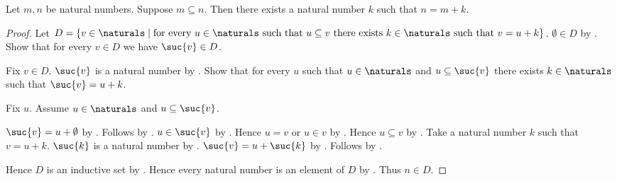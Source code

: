 \begin{theorem}\label{natural_additive_difference}
    Let $m,n$ be natural numbers.
    Suppose $m\subseteq n$.
    Then there exists a natural number $k$ such that $n=m+k$.
\end{theorem}
\begin{proof}
    Let $D=\{v\in\naturals\mid
        \text{for every $u\in\naturals$ such that $u\subseteq v$
        there exists $k\in\naturals$ such that $v=u+k$}\}$.
    $\emptyset\in D$
        by .
    Show that for every $v\in D$ we have $\suc{v}\in D$.
    \begin{subproof}
        Fix $v\in D$.
        $\suc{v}$ is a natural number by .
        Show that for every $u$ such that
            $u\in\naturals$ and $u\subseteq\suc{v}$
            there exists $k\in\naturals$ such that
            $\suc{v}=u+k$.
        \begin{subproof}
            Fix $u$.
            Assume $u\in\naturals$ and $u\subseteq\suc{v}$.
            \begin{byCase}
                    $\suc{v}=u+\emptyset$
                        by .
                    Follows by .
                    $u\in\suc{v}$
                        by .
                    Hence $u=v$ or $u\in v$ by .
                    Hence $u\subseteq v$
                        by .
                    Take a natural number $k$ such that $v=u+k$.
                    $\suc{k}$ is a natural number by .
                    $\suc{v}=u+\suc{k}$
                        by .
                    Follows by \auto.
            \end{byCase}
        \end{subproof}
    \end{subproof}
    Hence $D$ is an inductive set by .
    Hence every natural number is an element of $D$
        by .
    Thus $n\in D$.
\end{proof}

